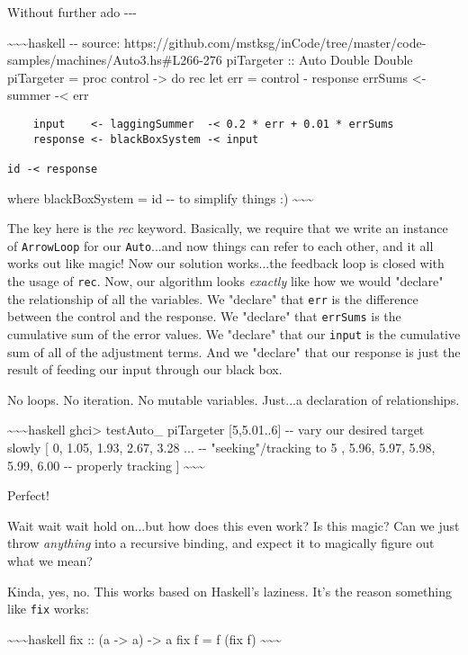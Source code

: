 \documentclass[]{article}
\begin{document}
Without further ado -\/-\/-

\textasciitilde{}\textasciitilde{}\textasciitilde{}haskell -\/- source:
https://github.com/mstksg/inCode/tree/master/code-samples/machines/Auto3.hs\#L266-276
piTargeter :: Auto Double Double piTargeter = proc control -\textgreater{} do
rec let err = control - response errSums \textless{}- summer -\textless{} err

\begin{verbatim}
    input    <- laggingSummer  -< 0.2 * err + 0.01 * errSums
    response <- blackBoxSystem -< input

id -< response
\end{verbatim}

where blackBoxSystem = id -\/- to simplify things :)
\textasciitilde{}\textasciitilde{}\textasciitilde{}

The key here is the \emph{rec} keyword. Basically, we require that we write an
instance of \texttt{ArrowLoop} for our \texttt{Auto}...and now things can refer
to each other, and it all works out like magic! Now our solution works...the
feedback loop is closed with the usage of \texttt{rec}. Now, our algorithm looks
\emph{exactly} like how we would "declare" the relationship of all the
variables. We "declare" that \texttt{err} is the difference between the control
and the response. We "declare" that \texttt{errSums} is the cumulative sum of
the error values. We "declare" that our \texttt{input} is the cumulative sum of
all of the adjustment terms. And we "declare" that our response is just the
result of feeding our input through our black box.

No loops. No iteration. No mutable variables. Just...a declaration of
relationships.

\textasciitilde{}\textasciitilde{}\textasciitilde{}haskell ghci\textgreater{}
testAuto\_ piTargeter {[}5,5.01..6{]} -\/- vary our desired target slowly {[} 0,
1.05, 1.93, 2.67, 3.28 ... -\/- "seeking"/tracking to 5 , 5.96, 5.97, 5.98,
5.99, 6.00 -\/- properly tracking {]}
\textasciitilde{}\textasciitilde{}\textasciitilde{}

Perfect!

Wait wait wait hold on...but how does this even work? Is this magic? Can we just
throw \emph{anything} into a recursive binding, and expect it to magically
figure out what we mean?

Kinda, yes, no. This works based on Haskell's laziness. It's the reason
something like \texttt{fix} works:

\textasciitilde{}\textasciitilde{}\textasciitilde{}haskell fix :: (a
-\textgreater{} a) -\textgreater{} a fix f = f (fix f)
\textasciitilde{}\textasciitilde{}\textasciitilde{}
\end{document}
